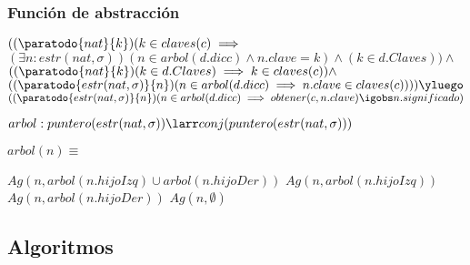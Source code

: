 \subsubsection*{Función de abstracción}
$((\paratodo{nat}{k})( k \in claves(c) \implies $\\$(\exists n: estr(nat, \sigma))(n \in arbol(d.dicc) \land n.clave = k) \land (k \in d.Claves)) \land $\\$((\paratodo{nat}{k})(k \in d.Claves) \implies k \in claves(c)) \land $\\$ ((\paratodo{estr(nat, \sigma)}{n})(n \in arbol(d.dicc) \implies n.clave \in claves(c)))) \yluego $\\$((\paratodo{estr(nat, \sigma)}{n})(n \in arbol(d.dicc) \implies obtener(c,n.clave) \igobs n.significado)$
  
$arbol: puntero(estr(nat, \sigma)) \larr conj(puntero(estr(nat, \sigma)))$

$arbol(n) \equiv $
\begin{algorithmic}
	\State $Ag(n, arbol(n.hijoIzq) \cup arbol(n.hijoDer))$
\Else
		\State $Ag(n,arbol(n.hijoIzq))$
	\Else
		\State $Ag(n,arbol(n.hijoDer))$ 
		\Else 
		\State $Ag(n,\emptyset)$ 
		\EndIf
	\EndIf
\EndIf
\end{algorithmic}
		


\subsection{Algoritmos}




